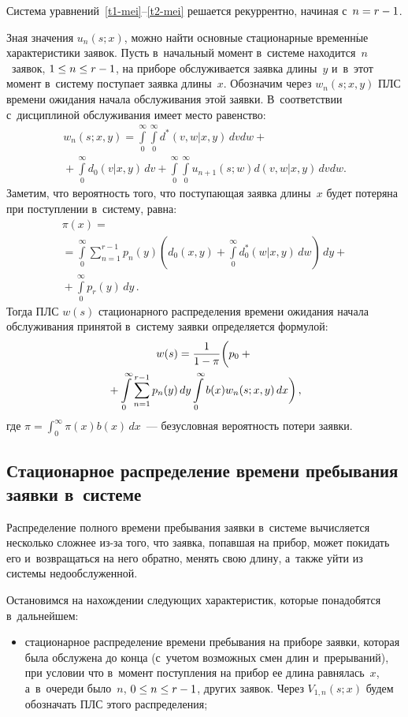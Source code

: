 \begin{multicols}{2}
Система уравнений~\eqref{t1-mei}--\eqref{t2-mei} решается
рекуррентно, начиная с~$n\hm=r\hm-1$.

Зная значения $u_{n}(s;x)$, можно найти основные стационарные
временн$\acute{\mbox{ы}}$е характеристики заявок.
Пусть в~начальный момент в~системе находится~$n$~заявок, $1 \hm\le n \hm\le r-1$,
на приборе обслуживается заявка длины~$y$ и~в~этот момент
в~систему поступает заявка длины~$x$.
Обозначим через $w_n(s;x,y)$ ПЛС времени ожидания
начала обслуживания этой заявки. В~соответствии 
с~дисциплиной обслуживания имеет место равенство:
\begin{multline*}
w_n(s;x,y)=\int\limits_0^\infty \int\limits_0^\infty d^*(v,w|x,y)\, dv dw
+{}\\
{}+\int\limits_0^\infty\! d_0(v|x,y) \,dv
+ \int\limits_0^\infty \!\int\limits_0^\infty \!u_{n+1}(s;w) d(v,w|x,y)\, dv dw.
\end{multline*}
Заметим, что вероятность того, что поступающая заявка 
длины~$x$ будет потеряна при поступлении в~систему, равна:
\begin{multline*}
\pi(x)= {}\\
{}=\int\limits_0^\infty  \sum\limits_{n=1}^{r-1} p_n(y)
\left( d_0(x,y)+\int\limits_0^\infty d_0^*(w|x,y)\, dw\right)\,dy
+{}\\
{}+ \int\limits_0^\infty p_r(y)\, dy\,.
\end{multline*}
Тогда ПЛС $w(s)$ стационарного распределения времени ожидания начала обслуживания принятой
в~систему заявки определяется формулой:
\begin{multline*}
w(s) =\displaystyle\frac{\displaystyle 1\mathstrut}{\displaystyle 1-\pi\mathstrut} \biggl (
p_0 + {}\\
{}+\int\limits_0^\infty  \sum\limits_{n=1}^{r-1} p_n(y)\, dy
\int\limits_0^\infty b(x)  w_n(s;x,y)\, dx
\biggl )\,, 
\end{multline*}
где $\pi=\int_0^\infty \pi(x) b(x) \,dx$~--- безусловная вероятность потери заявки.


\subsection{Стационарное распределение времени пребывания заявки в~системе}


Распределение полного времени пребывания заявки в~системе вычисляется
несколько сложнее из-за того, что заявка, попавшая на прибор,
может покидать его и~возвращаться на него обратно,
менять свою длину, а~также уйти из системы недообслуженной.

Остановимся на нахождении следующих характеристик, которые
понадобятся в~дальнейшем:
\begin{itemize}
\item стационарное распределение времени пребывания на приборе заявки,
которая была обслужена до конца (с~учетом возможных смен длин
и~прерываний), при условии что в~момент поступления на прибор
ее длина равнялась~$x$, а~в~очереди было~$n$, $0\hm\le n\hm\le r\hm-1$, других заявок.
Через $V_{1,n}(s;x)$ будем обозначать ПЛС этого распределения;


\end{itemize}
\end{multicols}
